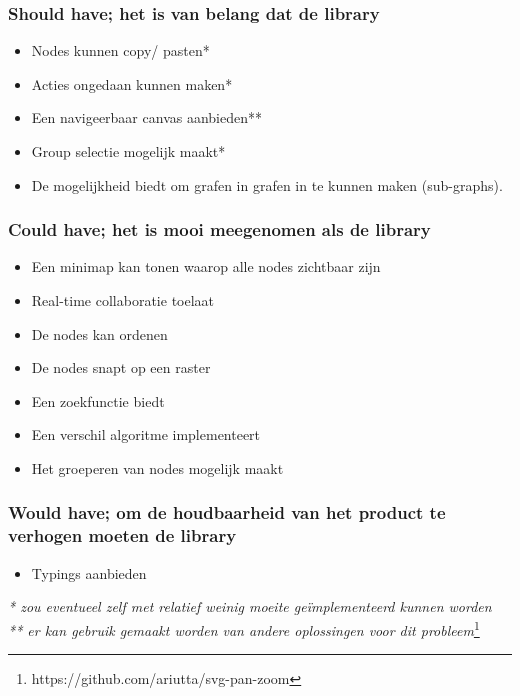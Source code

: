 \subsubsection{Should have; het is van belang dat de library}
\begin{itemize}
    \item Nodes kunnen copy/ pasten*
    \item Acties ongedaan kunnen maken*
    \item Een navigeerbaar canvas aanbieden**
    \item Group selectie mogelijk maakt*
    \item De mogelijkheid biedt om grafen in grafen in te kunnen maken (sub-graphs).
\end{itemize}

\subsubsection{Could have; het is mooi meegenomen als de library}
\begin{itemize}
    \item Een minimap kan tonen waarop alle nodes zichtbaar zijn
    \item Real-time collaboratie toelaat
    \item De nodes kan ordenen
    \item De nodes snapt op een raster
    \item Een zoekfunctie biedt
    \item Een verschil algoritme implementeert
    \item Het groeperen van nodes mogelijk maakt
\end{itemize}

\subsubsection{Would have; om de houdbaarheid van het product te verhogen moeten de library}
\begin{itemize}
    \item Typings aanbieden
\end{itemize}

\noindent \textit{* zou eventueel zelf met relatief weinig moeite geïmplementeerd kunnen worden}\\
\textit{** er kan gebruik gemaakt worden van andere oplossingen voor dit probleem}\footnote{https://github.com/ariutta/svg-pan-zoom}

